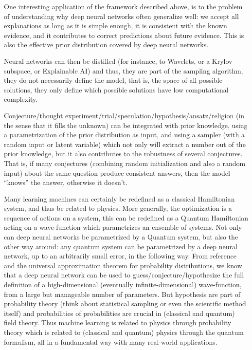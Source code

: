 \documentclass[11pt]{book}
\begin{document}
One interesting application of the framework described above, is to the
problem of understanding why deep neural networks often generalize well:
we accept all explanations as long as it is simple enough, it is
consistent with the known evidence, and it contributes to correct
predictions about future evidence. This is also the effective prior
distribution covered by deep neural networks.

Neural networks can then be
distilled\cite{singh_useful_2022} (for
instance, to Wavelets, or a Krylov subspace, or Explainable
AI\cite{zhang_explainable_2022}) and thus, they are part of the sampling
algorithm, they do not necessarily define the model, that is, the space
of all possible solutions, they only define which possible solutions
have low computational complexity.

Conjecture/thought
experiment/trial/speculation/hypothesis/ansatz/religion (in the sense
that it fills the unknown) can be integrated with prior knowledge, using
a parametrization of the prior distribution as input, and using a
sampler (with a random input or latent variable) which not only will
extract a number out of the prior knowledge, but it also contributes to
the robustness of several conjectures. That is, if many conjectures
(combining random initialization and also a random input) about the same
question produce consistent answers, then the model ``knows'' the
answer, otherwise it doesn't.

Many learning machines can certainly be redefined as a classical
Hamiltonian
system\cite{lopez-pastor_self-learning_2023}, and thus be related to physics. More generally,
the optimization is a sequence of actions on a system, this can be
redefined as a Quantum Hamiltonian acting on a wave-function which
parametrizes an ensemble of systems. Not only can deep neural networks
be parametrized by a Quantum system, but also the other way around: any
quantum system can be parametrized by a deep neural network, up to an
arbitrarily small error, in the following way. From
reference\cite{hermann_ab_2023}
and the universal approximation theorem for probability
distributions\cite{lu_universal_2020}\cite{kratsios_universal_2021}\cite{dupont_data_2022},
we know that a deep neural network can be used to
guess/conjecture/hypothesize the full definition of a high-dimensional
(eventually infinite-dimensional) wave-function, from a large but
manageable number of parameters. But hypothesis are part of probability
theory (think about statistical sampling or even the scientific method
itself) and probabilities of probabilities are crucial in (classical and
quantum) field theory. Thus machine learning is related to physics
through probability theory which is related to (classical and quantum)
physics through the quantum formalism, all in a fundamental way with
many real-world applications.
\end{document}
